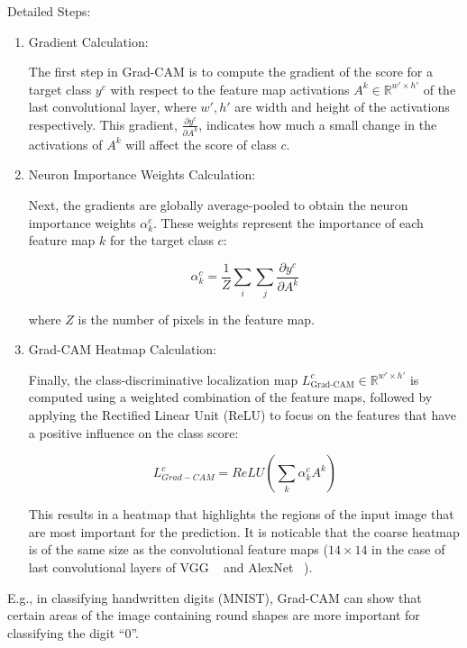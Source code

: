 \documentclass{article}
\begin{document}
Detailed Steps:
\begin{enumerate}
    \item Gradient Calculation:
    
    The first step in Grad-CAM is to compute the gradient of the score for a target class $y^c$ with respect to the feature map activations $A^k \in \mathds{R}^{w' \times h'}$ of the last convolutional layer, where $w',h'$ are width and height of the activations respectively. This gradient, $\frac{\partial y^c}{\partial A^k}$, indicates how much a small change in the activations of $A^k$ will affect the score of class $c$.
    
    \item Neuron Importance Weights Calculation:
    
    Next, the gradients are globally average-pooled to obtain the neuron importance weights $\alpha^c_k$. These weights represent the importance of each feature map $k$ for the target class $c$:
    
    \begin{equation}
        \alpha^c_k = \dfrac{1}{Z}\sum_{i} \sum_{j} \dfrac{\partial y^c}{\partial A^k}
    \end{equation}
    
    where $Z$ is the number of pixels in the feature map.

    \item Grad-CAM Heatmap Calculation:
    
    Finally, the class-discriminative localization map $L^c_{\text{Grad-CAM}} \in \mathds{R}^{w' \times h'}$ is computed using a weighted combination of the feature maps, followed by applying the Rectified Linear Unit (ReLU) to focus on the features that have a positive influence on the class score:

    \begin{equation}
        L_{Grad-CAM}^{c} = ReLU ( \sum_{k} \alpha^c_k A^k )
    \end{equation}
    
    This results in a heatmap that highlights the regions of the input image that are most important for the prediction. It is noticable that the coarse heatmap is of the same size as the convolutional feature maps ($14 \times 14$ in the case of last convolutional layers of VGG ~\cite{simonyan2015deep} and AlexNet ~\cite{krizhevsky2012}).

\end{enumerate}

E.g., in classifying handwritten digits (MNIST), Grad-CAM can show that certain areas of the image containing round shapes are more important for classifying the digit “0”.
\end{document}
